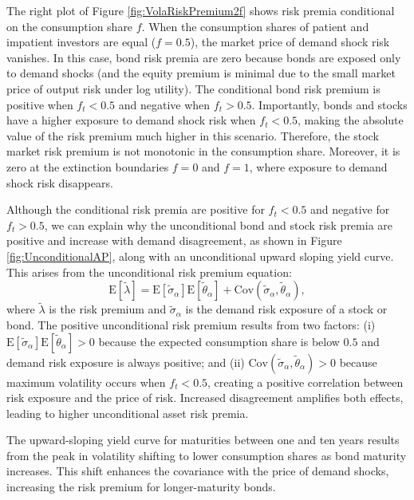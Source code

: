 \documentclass[preprint,11pt,authoryear]{elsarticle}
\theoremstyle{plain}
\begin{document}
The right plot of Figure \ref{fig:VolaRiskPremium2f} shows risk premia conditional on the consumption share \( f \). When the consumption shares of patient and impatient investors are equal (\( f = 0.5 \)), the market price of demand shock risk vanishes. In this case, bond risk premia are zero because bonds are exposed only to demand shocks (and the equity premium is minimal due to the small market price of output risk under log utility). The conditional bond risk premium is positive when \( f_t < 0.5 \) and negative when \( f_t > 0.5 \). Importantly, bonds and stocks have a higher exposure to demand shock risk when \( f_t < 0.5 \), making the absolute value of the risk premium much higher in this scenario. Therefore, the stock market risk premium is not monotonic in the consumption share. Moreover, it is zero at the extinction boundaries \( f = 0 \) and \( f = 1 \), where exposure to demand shock risk disappears.

Although the conditional risk premia are positive for \( f_t < 0.5 \) and negative for \( f_t > 0.5 \), we can explain why the unconditional bond and stock risk premia are positive and increase with demand disagreement, as shown in Figure \ref{fig:UnconditionalAP}, along with an unconditional upward sloping yield curve. This arises from the unconditional risk premium equation:
\[
\mathrm{E} \left[ \tilde{\lambda} \right] = \mathrm{E} \left[ \tilde{\sigma}_{\alpha} \right] \mathrm{E} \left[ \tilde{\theta}_{\alpha} \right] + \mathrm{Cov} \left( \tilde{\sigma}_{\alpha}, \tilde{\theta}_{\alpha} \right),
\]
where \( \tilde{\lambda} \) is the risk premium and \( \tilde{\sigma}_{\alpha} \) is the demand risk exposure of a stock or bond. The positive unconditional risk premium results from two factors: (i) \(\mathrm{E} \left[ \tilde{\sigma}_{\alpha} \right] \mathrm{E} \left[ \tilde{\theta}_{\alpha} \right] > 0\) because the expected consumption share is below \( 0.5 \) and demand risk exposure is always positive; and (ii) \(\mathrm{Cov} \left( \tilde{\sigma}_{\alpha}, \tilde{\theta}_{\alpha} \right) > 0\) because maximum volatility occurs when \( f_t < 0.5 \), creating a positive correlation between risk exposure and the price of risk. Increased disagreement amplifies both effects, leading to higher unconditional asset risk premia.

The upward-sloping yield curve for maturities between one and ten years results from the peak in volatility shifting to lower consumption shares as bond maturity increases. This shift enhances the covariance with the price of demand shocks, increasing the risk premium for longer-maturity bonds.
\end{document}
